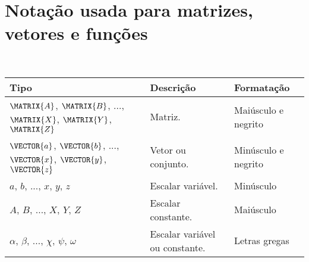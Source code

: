 \section{Notação usada para matrizes, vetores e funções}
\begin{notation}~\\
\begin{tabular}{p{} | p{} | p{} }
\hline	
\textbf{Tipo} & \textbf{Descrição} & \textbf{Formatação} \\ \hline
$\MATRIX{A}$, $\MATRIX{B}$, ..., $\MATRIX{X}$, $\MATRIX{Y}$, $\MATRIX{Z}$& Matriz. & Maiúsculo e negrito \\
$\VECTOR{a}$, $\VECTOR{b}$, ..., $\VECTOR{x}$, $\VECTOR{y}$, $\VECTOR{z}$ & Vetor ou conjunto. & Minúsculo e negrito \\
$a$, $b$, ..., $x$, $y$, $z$ & Escalar variável. & Minúsculo \\
$A$, $B$, ..., $X$, $Y$, $Z$ & Escalar constante. & Maiúsculo \\
$\alpha$, $\beta$, ..., $\chi$, $\psi$, $\omega$ & Escalar variável ou constante. & Letras gregas  \\ \hline
\end{tabular}
\end{notation}


